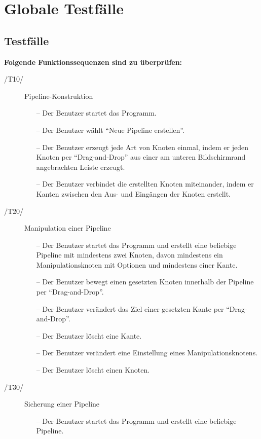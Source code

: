 \section{Globale Testfälle}

\subsection{Testfälle}

\textbf{Folgende Funktionssequenzen sind zu überprüfen:}

\begin{description}
	\item[/T10/] Pipeline-Konstruktion
		\begin{itemize}
			\item[--] Der Benutzer startet das Programm.
			\item[--] Der Benutzer wählt ``Neue Pipeline erstellen''.
			\item[--] Der Benutzer erzeugt jede Art von Knoten einmal, indem er jeden Knoten per ``Drag-and-Drop'' aus einer am unteren Bildschirmrand
				angebrachten Leiste erzeugt.
			\item[--] Der Benutzer verbindet die erstellten Knoten miteinander, indem er Kanten zwischen den Aus- und Eingängen der Knoten erstellt.
		\end{itemize}
	\item[/T20/] Manipulation einer Pipeline
		\begin{itemize}
			\item[--] Der Benutzer startet das Programm und erstellt eine beliebige Pipeline mit mindestens zwei Knoten, davon mindestens ein Manipulationsknoten mit Optionen 
				und mindestens einer Kante.
			\item[--] Der Benutzer bewegt einen gesetzten Knoten innerhalb der Pipeline per ``Drag-and-Drop''.
			\item[--] Der Benutzer verändert das Ziel einer gesetzten Kante per ``Drag-and-Drop''.
			\item[--] Der Benutzer löscht eine Kante.
			\item[--] Der Benutzer verändert eine Einstellung eines Manipulationsknotens.
			\item[--] Der Benutzer löscht einen Knoten.
		\end{itemize}
	\item[/T30/] Sicherung einer Pipeline
		\begin{itemize}
			\item[--] Der Benutzer startet das Programm und erstellt eine beliebige Pipeline.

\end{itemize}
\end{description}
